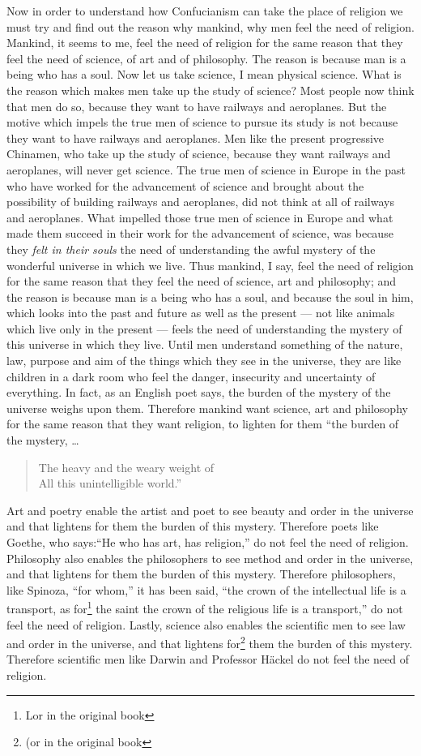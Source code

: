 Now in order to understand how Confucianism can take the place of religion we must try and find out the reason why mankind, why men feel the need of religion.
Mankind, it seems to me, feel the need of religion for the same reason that they feel the need of science, of art and of philosophy.
The reason is because man is a being who has a soul.
Now let us take science, I mean physical science.
What is the reason which makes men take up the study of science?
Most people now think that men do so, because they want to have railways and aeroplanes.
But the motive which impels the true men of science to pursue its study is not because they want to have railways and aeroplanes.
Men like the present progressive Chinamen, who take up the study of science, because they want railways and aeroplanes, will never get science.
The true men of science in Europe in the past who have worked for the advancement of science and brought about the possibility of building railways and aeroplanes, did not think at all of railways and aeroplanes.
What impelled those true men of science in Europe and what made them succeed in their work for the advancement of science, was because they \emph{felt in their souls} the need of understanding the awful mystery of the wonderful universe in which we live.
Thus mankind, I say, feel the need of religion for the same reason that they feel the need of science, art and philosophy; and the reason is because man is a being who has a soul, and because the soul in him, which looks into the past and future as well as the present --- not like animals which live only in the present --- feels the need of understanding the mystery of this universe in which they live.
Until men understand something of the nature, law, purpose and aim of the things which they see in the universe, they are like children in a dark room who feel the danger, insecurity and uncertainty of everything.
In fact, as an English poet says, the burden of the mystery of the universe weighs upon them.
Therefore mankind want science, art and philosophy for the same reason that they want religion, to lighten for them ``the burden of the mystery, \dots 
\begin{quote}\footnotesize
    The heavy and the weary weight of \\ 
    All this unintelligible world.''
\end{quote}

Art and poetry enable the artist and poet to see beauty and order in the universe and that lightens for them the burden of this mystery.
Therefore poets like Goethe, who says:``He who has art, has religion,'' do not feel the need of religion.
Philosophy also enables the philosophers to see method and order in the universe, and that lightens for them the burden of this mystery.
Therefore philosophers, like Spinoza, ``for whom,'' it has been said, ``the crown of the intellectual life is a transport, as for\footnote{Lor in the original book} the saint the crown of the religious life is a transport,'' do not feel the need of religion.
Lastly, science also enables the scientific men to see law and order in the universe, and that lightens for\footnote{(or in the original book} them the burden of this mystery.
Therefore scientific men like Darwin and Professor H\"ackel do not feel the need of religion.

